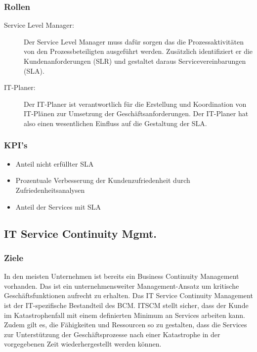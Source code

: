 \subsubsection{Rollen}

\begin{description}
	\item[Service Level Manager:] Der Service Level Manager muss dafür sorgen das die Prozessaktivitäten von den Prozessbeteiligten ausgeführt werden. Zusätzlich identifiziert er die Kundenanforderungen (SLR) und gestaltet daraus Servicevereinbarungen (SLA).
	\item[IT-Planer:] Der IT-Planer ist verantwortlich für die Erstellung und Koordination von IT-Plänen zur Umsetzung der Geschäftsanforderungen. Der IT-Planer hat also einen wesentlichen Einfluss auf die Gestaltung der SLA.
\end{description}

\subsubsection{KPI's}

\begin{itemize}
	\item Anteil nicht erfüllter SLA
	\item Prozentuale Verbesserung der Kundenzufriedenheit durch Zufriedenheitsanalysen
	\item Anteil der Services mit SLA
\end{itemize}

\subsection{IT Service Continuity Mgmt.}

\subsubsection{Ziele}

In den meisten Unternehmen ist bereits ein Business Continuity Management vorhanden. Das ist ein unternehmensweiter Management-Ansatz um kritische Geschäftsfunktionen aufrecht zu erhalten. Das IT Service Continuity Management ist der IT-spezifische Bestandteil des BCM. ITSCM stellt sicher, dass der Kunde im Katastrophenfall mit einem definierten Minimum an Services arbeiten kann. Zudem gilt es, die Fähigkeiten und Ressourcen so zu gestalten, dass die Services zur Unterstützung der Geschäftsprozesse nach einer Katastrophe in der vorgegebenen Zeit wiederhergestellt werden können.

